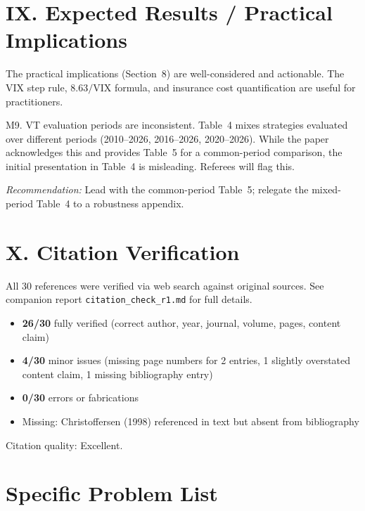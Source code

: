 \documentclass[12pt,a4paper]{article}
\begin{document}
\section*{IX. Expected Results / Practical Implications}

The practical implications (Section~8) are well-considered and actionable. The VIX step rule, $8.63/\text{VIX}$ formula, and insurance cost quantification are useful for practitioners.

\textcolor{warncolor}{M9. VT evaluation periods are inconsistent.} Table~4 mixes strategies evaluated over different periods (2010--2026, 2016--2026, 2020--2026). While the paper acknowledges this and provides Table~5 for a common-period comparison, the initial presentation in Table~4 is misleading. Referees will flag this.

\textit{Recommendation:} Lead with the common-period Table~5; relegate the mixed-period Table~4 to a robustness appendix.


\section*{X. Citation Verification}

All 30 references were verified via web search against original sources. See companion report \texttt{citation\_check\_r1.md} for full details.

\begin{itemize}[nosep]
\item \textbf{26/30} fully verified (correct author, year, journal, volume, pages, content claim)
\item \textbf{4/30} minor issues (missing page numbers for 2 entries, 1 slightly overstated content claim, 1 missing bibliography entry)
\item \textbf{0/30} errors or fabrications
\item Missing: Christoffersen (1998) referenced in text but absent from bibliography
\end{itemize}

Citation quality: \textcolor{okgreen}{Excellent}.


\section*{Specific Problem List}
\end{document}

